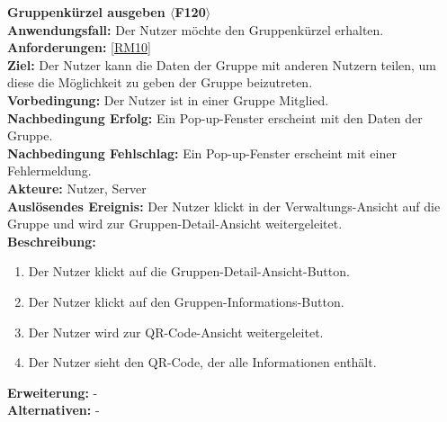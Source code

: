 \documentclass[parskip=full]{scrartcl}
\begin{document}
\textbf{Gruppenkürzel ausgeben $\langle$F120$\rangle$}\\
\textbf{Anwendungsfall:} Der Nutzer möchte den Gruppenkürzel erhalten.\\
\textbf{Anforderungen:} \ref{RM10}\\
\textbf{Ziel:} Der Nutzer kann die Daten der Gruppe mit anderen Nutzern teilen, um diese die Möglichkeit zu geben der Gruppe beizutreten.\\
\textbf{Vorbedingung:} Der Nutzer ist in einer Gruppe Mitglied.\\
\textbf{Nachbedingung Erfolg:} Ein Pop-up-Fenster erscheint mit den Daten der Gruppe.\\
\textbf{Nachbedingung Fehlschlag:} Ein Pop-up-Fenster erscheint mit einer Fehlermeldung.\\
\textbf{Akteure:} Nutzer, Server \\
\textbf{Auslösendes Ereignis:} Der Nutzer klickt in der Verwaltungs-Ansicht auf die Gruppe und wird zur Gruppen-Detail-Ansicht weitergeleitet.\\
\textbf{Beschreibung:}
\begin{enumerate}
    \item Der Nutzer klickt auf die Gruppen-Detail-Ansicht-Button.
    \item Der Nutzer klickt auf den Gruppen-Informations-Button.
    \item Der Nutzer wird zur QR-Code-Ansicht weitergeleitet.
    \item Der Nutzer sieht den QR-Code, der alle Informationen enthält.
\end{enumerate}
\textbf{Erweiterung:} -\\
\textbf{Alternativen:} -
\newpage
\end{document}
